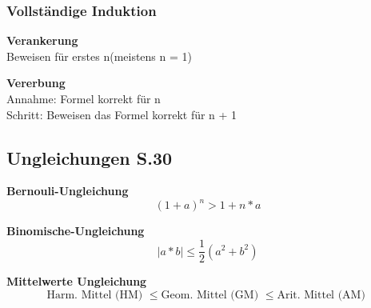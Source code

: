\documentclass{article}
\begin{document}
	\subsubsection{Vollständige Induktion}
	\begin{multicols}{2}
	\begin{center}
	    \textbf{Verankerung} \\
		Beweisen für erstes n(meistens n = 1)
	\end{center}
		\columnbreak
		\begin{center}
		    \textbf{Vererbung} \\
		    Annahme: Formel korrekt für n \\
		    Schritt: Beweisen das Formel korrekt für n + 1
		\end{center}
	\end{multicols}
	\subsection{Ungleichungen S.30}
	\begin{multicols}{2}
	\begin{center}
	\textbf{Bernouli-Ungleichung}
	    	\begin{equation}
		    (1 + a) ^ n > 1 + n * a
	    \end{equation}
	\end{center}
	\columnbreak
	\begin{center}
	\textbf{Binomische-Ungleichung}
	    \begin{equation}
		|a*b| \leq \frac{1}{2}(a^2 + b^2)
	    \end{equation}
	\end{center}
	\end{multicols}
	\textbf{Mittelwerte Ungleichung}
	\begin{equation}
		\textrm{Harm. Mittel (HM) } \leq \textrm{Geom. Mittel (GM) } \leq \textrm{Arit. Mittel (AM) }
	\end{equation}
	\newpage
\end{document}
